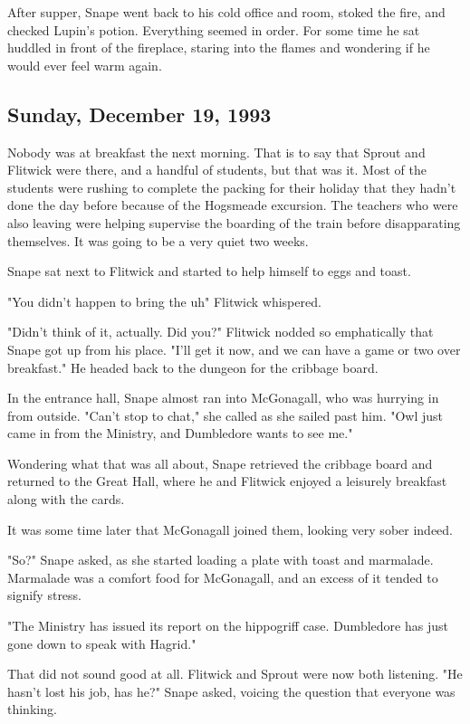After supper, Snape went back to his cold office and room, stoked the fire, and checked Lupin's potion. Everything seemed in order. For some time he sat huddled in front of the fireplace, staring into the flames and wondering if he would ever feel warm again.

\sbreak

\subsection{Sunday, December 19, 1993}

Nobody was at breakfast the next morning. That is to say that Sprout and Flitwick were there, and a handful of students, but that was it. Most of the students were rushing to complete the packing for their holiday that they hadn't done the day before because of the Hogsmeade excursion. The teachers who were also leaving were helping supervise the boarding of the train before disapparating themselves. It was going to be a very quiet two weeks.

Snape sat next to Flitwick and started to help himself to eggs and toast.

"You didn't happen to bring the{\el} uh{\el}" Flitwick whispered.

"Didn't think of it, actually. Did you{\el}?" Flitwick nodded so emphatically that Snape got up from his place. "I'll get it now, and we can have a game or two over breakfast." He headed back to the dungeon for the cribbage board.

In the entrance hall, Snape almost ran into McGonagall, who was hurrying in from outside. "Can't stop to chat," she called as she sailed past him. "Owl just came in from the Ministry, and Dumbledore wants to see me."

Wondering what that was all about, Snape retrieved the cribbage board and returned to the Great Hall, where he and Flitwick enjoyed a leisurely breakfast along with the cards.

It was some time later that McGonagall joined them, looking very sober indeed.

"So?" Snape asked, as she started loading a plate with toast and marmalade. Marmalade was a comfort food for McGonagall, and an excess of it tended to signify stress.

"The Ministry has issued its report on the hippogriff case. Dumbledore has just gone down to speak with Hagrid."

That did not sound good at all. Flitwick and Sprout were now both listening. "He hasn't lost his job, has he?" Snape asked, voicing the question that everyone was thinking.

